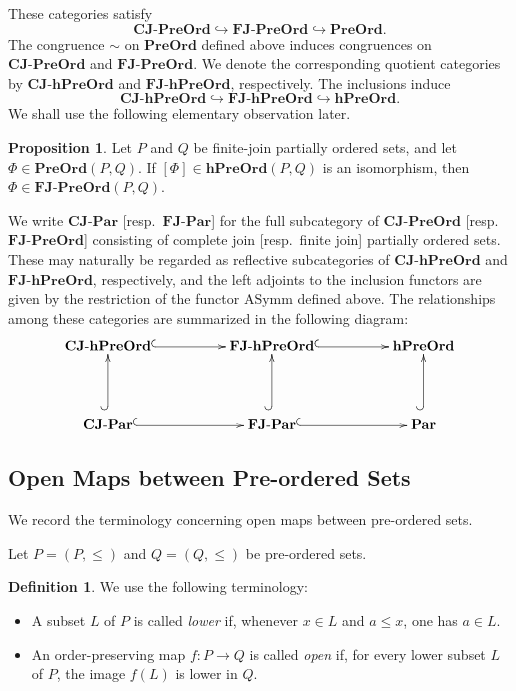 \documentclass[12pt, a4paper]{amsart}
\theoremstyle{definition}
\newtheorem{proposition}[theorem]{Proposition}
\newtheorem{definition}[theorem]{Definition}
\newcommand{\AS}{\mathrm{ASymm}}
\newcommand{\PreOrd}{\mathbf{PreOrd}}
\newcommand{\ParOrd}{\mathbf{Par}}
\newcommand{\hPreOrd}{\mathbf{hPreOrd}}
\newcommand{\CompJoinPreOrd}{\mathbf{CJ}\text{-}\mathbf{PreOrd}}
\newcommand{\CompJoinParOrd}{\mathbf{CJ}\text{-}\mathbf{Par}}
\newcommand{\hCompJoinPreOrd}{\mathbf{CJ}\text{-}\mathbf{hPreOrd}}
\newcommand{\FinJoinPreOrd}{\mathbf{FJ}\text{-}\mathbf{PreOrd}}
\newcommand{\FinJoinParOrd}{\mathbf{FJ}\text{-}\mathbf{Par}}
\newcommand{\hFinJoinPreOrd}{\mathbf{FJ}\text{-}\mathbf{hPreOrd}}
\begin{document}
These categories satisfy
\[
\CompJoinPreOrd \hookrightarrow
\FinJoinPreOrd \hookrightarrow
\PreOrd.
\]
The congruence $\sim$ on $\PreOrd$ defined above induces congruences on
$\CompJoinPreOrd$ and $\FinJoinPreOrd$.
We denote the corresponding quotient categories by
$\hCompJoinPreOrd$ and $\hFinJoinPreOrd$, respectively.
The inclusions induce
\[
\hCompJoinPreOrd \hookrightarrow
\hFinJoinPreOrd \hookrightarrow
\hPreOrd.
\]
We shall use the following elementary observation later.

\begin{proposition}\label{proposition:hpreisom_FJ}
Let $P$ and $Q$ be finite-join partially ordered sets, and let
$\Phi \in \PreOrd(P,Q)$. If $[\Phi] \in \hPreOrd(P,Q)$ is an isomorphism,
then $\Phi \in \FinJoinPreOrd(P,Q)$.
\end{proposition}

We write $\CompJoinParOrd$ [resp.~$\FinJoinParOrd$] for the full
subcategory of $\CompJoinPreOrd$ [resp.~$\FinJoinPreOrd$] consisting of
complete join [resp.~finite join] partially ordered sets.
These may naturally be regarded as reflective subcategories of
$\hCompJoinPreOrd$ and $\hFinJoinPreOrd$, respectively, and the left
adjoints to the inclusion functors are given by the restriction of the
functor $\AS$ defined above.
The relationships among these categories are summarized in the following
diagram:
\[
\xymatrix@C=5em@R=4em{
\hCompJoinPreOrd \ar@{^{(}->}[r]
&
\hFinJoinPreOrd \ar@{^{(}->}[r]
&
\hPreOrd
\\
\rule{0pt}{3ex}\CompJoinParOrd \ar@{^{(}->}[r]
                               \ar@{^{(}->}[u]
&
\rule{0pt}{3ex}\FinJoinParOrd \ar@{^{(}->}[r]
                              \ar@{^{(}->}[u]
&
\rule{0pt}{3ex}\ParOrd \ar@{^{(}->}[u]
}
\]

\subsection{Open Maps between Pre-ordered Sets}

We record the terminology concerning open maps between pre-ordered sets.

Let $P = (P,\leq)$ and $Q = (Q,\leq)$ be pre-ordered sets.

\begin{definition}\label{definition:open}
We use the following terminology:
\begin{itemize}
    \item A subset $L$ of $P$ is called \emph{lower} if, whenever $x \in L$ and $a \leq x$, one has $a \in L$.
    \item An order-preserving map $f : P \rightarrow Q$ is called \emph{open} if, for every lower subset $L$ of $P$, the image $f(L)$ is lower in $Q$.
\end{itemize}
\end{definition}
\end{document}
